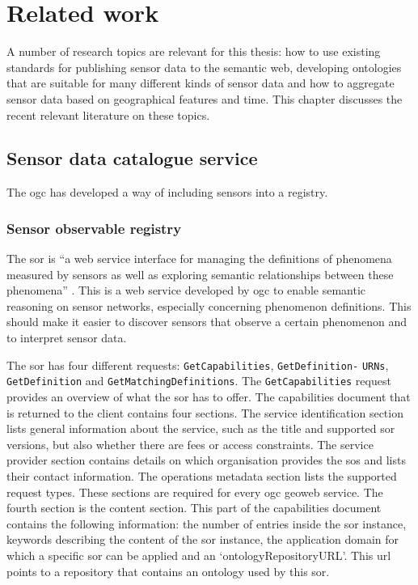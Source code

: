 

\chapter{Related work}
\label{chap:rw}
A number of research topics are relevant for this thesis: how to use existing standards for publishing sensor data to the semantic web, developing ontologies that are suitable for many different kinds of sensor data and how to aggregate sensor data based on geographical features and time. This chapter discusses the recent relevant literature on these topics.  

\section{Sensor data catalogue service}
The \ac{ogc} has developed a way of including sensors into a registry.

\subsection{Sensor observable registry}
The \ac{sor} is \enquote{a web service interface for managing the definitions of phenomena measured by sensors as well as exploring semantic relationships between these phenomena} \cite[p. vi]{SW:OGC4}. This is a web service developed by \ac{ogc} to enable semantic reasoning on sensor networks, especially concerning phenomenon definitions. This should make it easier to discover sensors that observe a certain phenomenon and to interpret sensor data.

The \ac{sor} has four different requests: \texttt{GetCapabilities}, \texttt{GetDefinition-} \texttt{URNs}, \texttt{GetDefinition} and \texttt{GetMatchingDefinitions}. The \texttt{GetCapabilities} request provides an overview of what the \ac{sor} has to offer. The capabilities document that is returned to the client contains four sections. The service identification section lists general information about the service, such as the title and supported \ac{sor} versions, but also whether there are fees or access constraints. The service provider section contains details on which organisation provides the \ac{sos} and lists their contact information. The operations metadata section lists the supported request types. These sections are required for every \ac{ogc} geoweb service. The fourth section is the content section. This part of the capabilities document contains the following information: the number of entries inside the \ac{sor} instance, keywords describing the content of the \ac{sor} instance, the application domain for which a specific \ac{sor} can be applied and an `ontologyRepositoryURL'. This \ac{url} points to a repository that contains an ontology used by this \ac{sor}.


